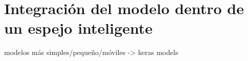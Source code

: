 \chapter{Integración del modelo dentro de un espejo inteligente} \label{Chapter:7}



modelos más simples/pequeño/móviles -> keras models